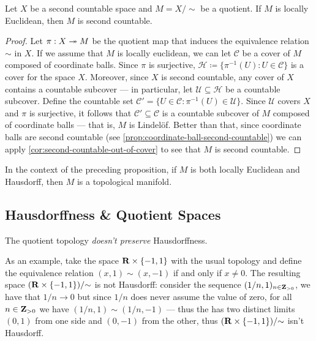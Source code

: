 \begin{proposition}
    \label{prop:quot-second-count-locall-euclidean}
    Let \(X\) be a second countable space and \(M = X / {\sim}\) be a quotient. If
    \(M\) is locally Euclidean, then \(M\) is second countable.
\end{proposition}

\begin{proof}
    Let \(\pi: X \twoheadrightarrow M\) be the quotient map that induces the equivalence
    relation \(\sim\) in \(X\). If we assume that \(M\) is locally euclidean, we can
    let \(\mathcal{C}\) be a cover of \(M\) composed of coordinate balls. Since
    \(\pi\) is surjective, \(\mathcal H \coloneq \{\pi^{-1}(U) \colon U \in
    \mathcal{C}\}\) is a cover for the space \(X\). Moreover, since \(X\) is second
    countable, any cover of \(X\) contains a countable subcover --- in particular,
    let \(\mathcal U \subseteq \mathcal H\) be a countable subcover. Define the
    countable set \(\mathcal{C}' = \{U \in \mathcal{C} \colon \pi^{-1}(U) \in
    \mathcal{U}\}\). Since \(\mathcal{U}\) covers \(X\) and \(\pi\) is surjective,
    it follows that \(\mathcal{C}' \subseteq \mathcal{C}\) is a countable subcover
    of \(M\) composed of coordinate balls --- that is, \(M\) is Lindelöf. Better
    than that, since coordinate balls are second countable (see
    \cref{prop:coordinate-ball-second-countable}) we can apply
    \cref{cor:second-countable-out-of-cover} to see that \(M\) is second
    countable.
\end{proof}

\begin{corollary}
    \label{cor:manifold-from-quotient}
    In the context of the preceding proposition, if \(M\) is both locally Euclidean
    and Hausdorff, then \(M\) is a topological manifold.
\end{corollary}

\subsection{Hausdorffness \& Quotient Spaces}

\begin{remark}
    \label{rem:quotient-doesnt-preserve-hausdorff}
    The quotient topology \emph{doesn't preserve} Hausdorffness.

    As an example, take the space \(\mathbf{R} \times \{-1, 1\}\) with the usual topology
    and define the equivalence relation \((x, 1) \sim (x, -1)\) if and only if
    \(x \neq 0\). The resulting space \((\mathbf{R} \times \{-1, 1\})/{\sim}\) is not
    Hausdorff: consider the sequence \((1/n, 1)_{n \in \mathbf{Z}_{>0}}\), we have that
    \(1/n \to 0\) but since \(1/n\) does never assume the value of zero, for all
    \(n \in \mathbf{Z}_{>0}\) we have \((1/n, 1) \sim (1/n, -1)\) --- thus the has two
    distinct limits \((0, 1)\) from one side and \((0, -1)\) from the other, thus
    \((\mathbf{R} \times \{-1, 1\})/{\sim}\) isn't Hausdorff.
\end{remark}

